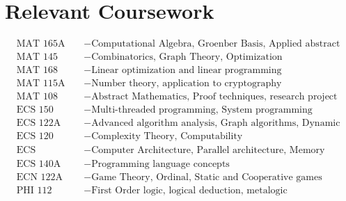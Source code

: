 \section{\sc Relevant Coursework}
\begin{align*}
&\text{MAT 165A} &&- \text{Computational Algebra, Groenber Basis, Applied abstract algebra}\\
&\text{MAT 145} &&- \text{Combinatorics, Graph Theory, Optimization}\\
&\text{MAT 168} &&- \text{Linear optimization and linear programming}\\
&\text{MAT 115A} &&- \text{Number theory, application to cryptography}\\
&\text{MAT 108} &&- \text{Abstract Mathematics, Proof techniques, research project}\\
&\text{ECS 150} &&- \text{Multi-threaded programming, System programming}\\
&\text{ECS 122A} &&- \text{Advanced algorithm analysis, Graph algorithms, Dynamic programming}\\
&\text{ECS 120} &&- \text{Complexity Theory, Computability }\\
&\text{ECS 154A/B} &&- \text{Computer Architecture, Parallel architecture, Memory architecture}\\
&\text{ECS 140A} &&- \text{Programming language concepts} \\
&\text{ECN 122A} &&- \text{Game Theory, Ordinal, Static and Cooperative games}\\
&\text{PHI 112} &&- \text{First Order logic, logical deduction, metalogic}
\end{align*}

\endinput